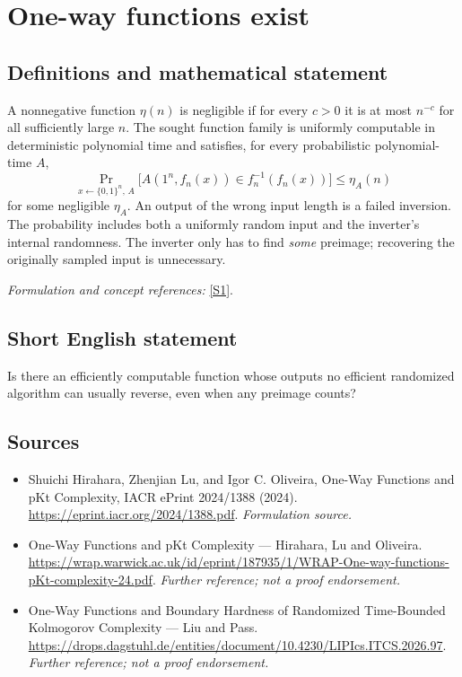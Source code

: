 \documentclass[11pt]{article}
\begin{document}
\section*{\texorpdfstring{One-way functions exist}{One-way functions exist}}\label{statement}
\subsection{Definitions and mathematical statement}
A nonnegative function $\eta(n)$ is negligible if for every $c>0$ it is at most $n^{-c}$ for all sufficiently large $n$. The sought function family is uniformly computable in deterministic polynomial time and satisfies, for every probabilistic polynomial-time $A$,
\[
 \Pr_{x\leftarrow\{0,1\}^n,\,A}\!\bigl[A(1^n,f_n(x))\in f_n^{-1}(f_n(x))\bigr]
 \le \eta_A(n)
\]
for some negligible $\eta_A$. An output of the wrong input length is a failed inversion. The probability includes both a uniformly random input and the inverter's internal randomness. The inverter only has to find \emph{some} preimage; recovering the originally sampled input is unnecessary.
\par\smallskip\textit{Formulation and concept references:} \href{https://eprint.iacr.org/2024/1388.pdf}{[S1]}.

\subsection{Short English statement}
Is there an efficiently computable function whose outputs no efficient randomized algorithm can usually reverse, even when any preimage counts?
\subsection{Sources}
\begin{itemize}
\item[S1]Shuichi Hirahara, Zhenjian Lu, and Igor C. Oliveira, One-Way Functions and pKt Complexity, IACR ePrint 2024/1388 (2024).
\url{https://eprint.iacr.org/2024/1388.pdf}.
\textit{Formulation source.}
\item[S2]One-Way Functions and pKt Complexity — Hirahara, Lu and Oliveira.
\url{https://wrap.warwick.ac.uk/id/eprint/187935/1/WRAP-One-way-functions-pKt-complexity-24.pdf}.
\textit{Further reference; not a proof endorsement.}
\item[S3]One-Way Functions and Boundary Hardness of Randomized Time-Bounded Kolmogorov Complexity — Liu and Pass.
\url{https://drops.dagstuhl.de/entities/document/10.4230/LIPIcs.ITCS.2026.97}.
\textit{Further reference; not a proof endorsement.}
\end{itemize}
\end{document}
